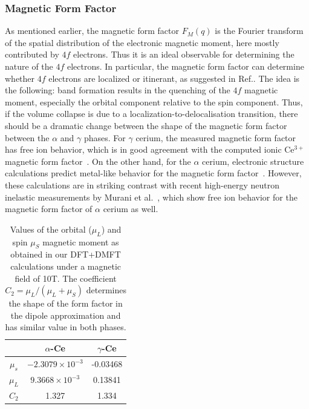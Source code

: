 \documentclass[10pt]{ruthesis}
\begin{document}
{\subsubsection{Magnetic Form Factor}
As mentioned earlier, the magnetic form factor $F_M(q)$ is the
Fourier transform of the spatial distribution of the electronic
magnetic moment, here mostly contributed by $4f$ electrons. Thus it is
an ideal observable for determining the nature of the $4f$ electrons.
In particular, the magnetic form factor can determine whether $4f$
electrons are localized or itinerant, as suggested in
Ref.\cite{hjelm1994}. The idea is the following: band formation
results in the quenching of the $4f$ magnetic moment, especially the
orbital component relative to the spin component. Thus, if the volume
collapse is due to a localization-to-delocalisation transition, there
should be a dramatic change between the shape of the magnetic form
factor between the $\alpha$ and $\gamma$ phases.  For $\gamma$ cerium,
the measured magnetic form factor has free ion behavior, which is in
good agreement with the computed ionic Ce$^{3+}$ magnetic form
factor~\cite{stassis}.  On the other hand, for the $\alpha$ cerium,
electronic structure calculations predict metal-like behavior for the
magnetic form factor~\cite{hjelm1994}.  However, these calculations
are in striking contrast with recent high-energy neutron inelastic
measurements by Murani et al.~\cite{murani}, which show free ion
behavior for the magnetic form factor of $\alpha$ cerium as well.


%

\begin{table}[H]
\begin{center}
\begin{tabular}{|c|c|c|}
\hline 
 & $\alpha$-Ce & $\gamma$-Ce \\
 \hline
$\mu_s$ & $-2.3079\times10^{-3}$ & -0.03468 \\
$\mu_L$ & $9.3668\times10^{-3}$ & 0.13841\\
$C_2$ & 1.327 & 1.334 \\
\hline
\end{tabular}
\caption{
Values of the orbital ($\mu_L$) and spin $\mu_S$ magnetic moment as
obtained in our DFT+DMFT calculations under a magnetic field of 10T. The coefficient
$C_2=\mu_L/(\mu_L + \mu_S)$ determines the shape of the form factor in
the dipole approximation and has similar value in both phases.
%
}
\label{table1_Ce}
\end{center}
\end{table}

}
\end{document}
